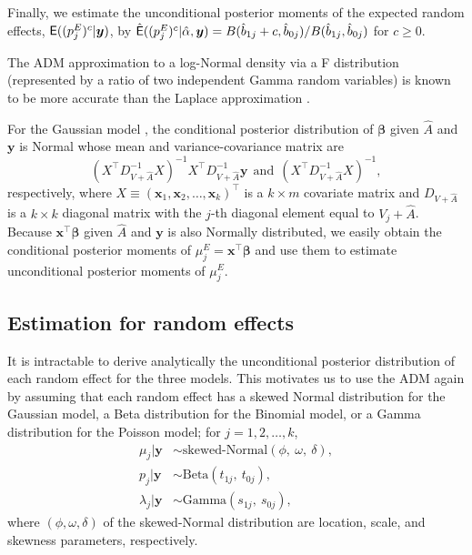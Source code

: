 \documentclass[article]{jss}
\begin{document}
Finally, we estimate the unconditional posterior moments of the expected random effects, $\mathsf{E}((p^E_{j})^c\vert\boldsymbol{y})$, by $\hat{\mathsf{E}}((p^E_{j})^c\vert\hat{\alpha}, \boldsymbol{y})=B(\hat{b}_{1j} + c, \hat{b}_{0j})/B(\hat{b}_{1j}, \hat{b}_{0j})$ for $c\ge0$.

The ADM approximation to a log-Normal density via a F distribution (represented by a ratio of two independent Gamma random variables) is known to be more accurate than the Laplace approximation \citep{carl1988}.


For the Gaussian model \citep{tang2011}, the conditional posterior distribution of $\boldsymbol{\beta}$ given $\hat{A}$ and $\boldsymbol{y}$ is Normal whose mean and variance-covariance matrix are
\begin{equation}
(X^\top D^{-1}_{V+\hat{A}} X)^{-1}X^\top D^{-1}_{V+\hat{A}}\boldsymbol{y}~~ \textrm{and}~~ (X^\top D^{-1}_{V+\hat{A}} X)^{-1},
\end{equation}
respectively, where $X\equiv (\boldsymbol{x}_1, \boldsymbol{x}_2, \ldots, \boldsymbol{x}_k)^\top$ is a $k \times m$ covariate matrix and $D_{V+\hat{A}}$ is a $k \times k$ diagonal matrix with the $j$-th diagonal element equal to $V_j+\hat{A}$. Because $\boldsymbol{x}^\top\boldsymbol{\beta}$ given $\hat{A}$ and $\boldsymbol{y}$ is also Normally distributed, we easily obtain the conditional posterior moments of $\mu^E_j=\boldsymbol{x}^\top\boldsymbol{\beta}$ and use them to estimate unconditional posterior moments of $\mu^E_j$.


\subsection{Estimation for random effects}
It is intractable to derive analytically the unconditional posterior distribution of each random effect  for the three models. This motivates us to use the ADM again by assuming that each random effect has a skewed Normal distribution \citep{azzalini1985class} for the Gaussian model, a Beta distribution for the Binomial model, or a Gamma distribution for the Poisson model; for $j=1, 2, \ldots, k$,
\begin{align}
\mu_j\vert\boldsymbol{y} &\sim \textrm{skewed-Normal}(\phi,~ \omega,~ \delta),\label{skewnormal}\\
p_j\vert \boldsymbol{y} &\sim \textrm{Beta}(t_{1j},~ t_{0j}),\label{betapost}\\
\lambda_j\vert \boldsymbol{y} &\sim \textrm{Gamma}(s_{1j},~ s_{0j}),\label{gammapost}
\end{align}
where $(\phi, \omega, \delta)$ of the skewed-Normal distribution  are location,  scale, and skewness parameters, respectively.
\end{document}
